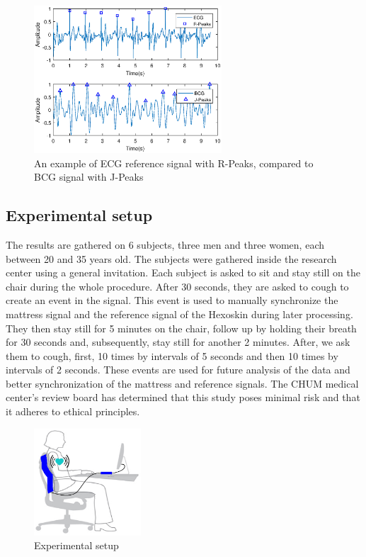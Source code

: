 \documentclass[twoside,twocolumn]{article}
\begin{document}
	\begin{figure}
		\hfill\includegraphics[width=7cm]{ECGvsBCG.eps}\hspace*{\fill}
		\caption{An example of ECG reference signal with R-Peaks, compared to BCG signal with J-Peaks}
		\label{fig:ecgbcg}
	\end{figure}
	
	\subsection{Experimental setup}
	The results are gathered on 6 subjects, three men and three women, each between 20 and 35 years old. The subjects were gathered inside the research center using a general invitation. Each subject is asked to sit and stay still on the chair during the whole procedure. After 30 seconds, they are asked to cough to create an event in the signal. This event is used to manually synchronize the mattress signal and the reference signal of the Hexoskin during later processing. They then stay still for 5 minutes on the chair, follow up by holding their breath for 30 seconds and, subsequently,  stay still for another 2 minutes. After, we ask them to cough, first, 10 times by intervals of 5 seconds and then 10 times by intervals of 2 seconds. These events are used for future analysis of the data and better synchronization of the mattress and reference signals. The CHUM medical center's review board has determined that this study poses minimal risk and that it adheres to ethical principles.
	
	\begin{figure}
		\hfill\includegraphics[width=4cm]{chair1.eps}\hspace*{\fill}
		\caption{Experimental setup}
		\label{fig:chair}
	\end{figure}
	
\end{document}
